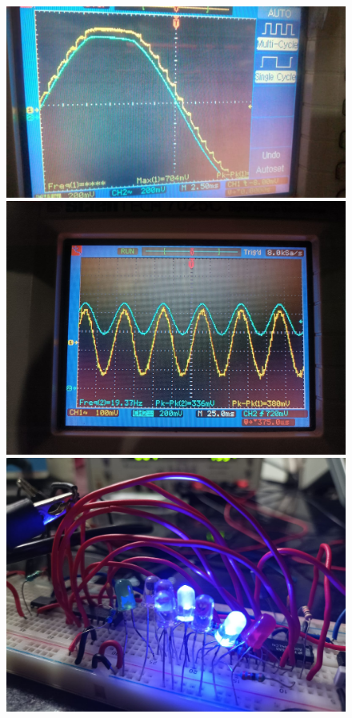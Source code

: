 	\begin{figure}
		\centering
		\includegraphics[width=0.8\columnwidth]{images/1.jpg}
		\includegraphics[width=0.8\columnwidth]{images/2.jpg}
		\includegraphics[width=0.8\columnwidth]{images/3.jpg}
	\end{figure}